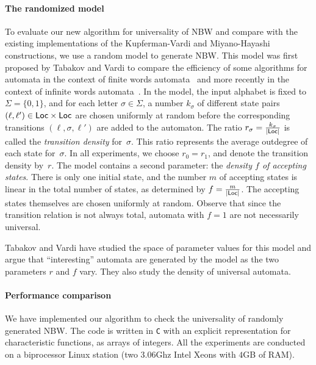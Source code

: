 \documentclass{LMCS}
\renewcommand{\l}{{\ell}}
\newcommand{\Loc}{{\sf Loc}}
\begin{document}
\paragraph{{\bf The randomized model}}
To evaluate our new algorithm for universality of NBW and compare with
the existing implementations of the Kupferman-Vardi and Miyano-Hayashi
constructions, we use a random model to generate NBW.  This model was
first proposed by Tabakov and Vardi to compare the efficiency of
some algorithms for automata in the context of finite words 
automata~\cite{TabakovV05} and more recently in the context of infinite
words automata~\cite{TabakovV07}.
In the model, the input alphabet is fixed to $\Sigma=\{0,1\}$, and for
each letter $\sigma \in \Sigma$, a number $k_\sigma$ of different
state pairs $(\l, \l') \in \Loc \times \Loc$ are chosen uniformly at
random before the corresponding transitions $(\l,\sigma,\l')$ are
added to the automaton.  The ratio $r_\sigma=\frac{k_\sigma}{|\Loc|}$
is called the \emph{transition density} for~$\sigma$.  This ratio
represents the average outdegree of each state for~$\sigma$.  In all
experiments, we choose $r_0=r_1$, and denote the transition density
by~$r$.  The model contains a second parameter: the \emph{density $f$
  of accepting states}.  There is only one initial state, and the
number $m$ of accepting states is linear in the total number of
states, as determined by $f=\frac{m}{|\Loc|}$.  The accepting states
themselves are chosen uniformly at random.  Observe that since the
transition relation is not always total, automata with $f=1$ are not
necessarily universal.

Tabakov and Vardi have studied the space of parameter values for this
model and argue that ``interesting'' automata are generated by the
model as the two parameters $r$ and $f$ vary. They also study the 
density of universal automata.

\paragraph{{\bf Performance comparison}}
We have implemented our algorithm to check the universality of
randomly generated NBW. The code is written in {\tt C} with an
explicit representation for characteristic functions, as arrays of
integers.  All the experiments are conducted on a biprocessor Linux
station (two $3.06$Ghz Intel Xeons with $4$GB of RAM).
\end{document}
